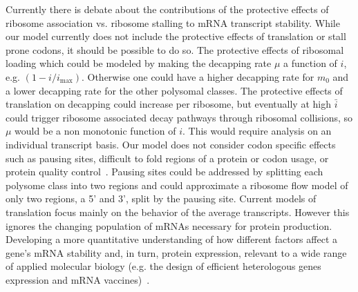 \documentclass[10pt,letterpaper]{article}
\newcommand{\imax}{\ensuremath{{i_{\max}}}\xspace}
\newcommand{\MRL}{\ensuremath{\bar{i}}\xspace}
\begin{document}
Currently there is debate about the contributions of the protective effects of ribosome association vs. ribosome stalling to mRNA transcript stability.
While our model currently does not include the protective effects of translation or stall prone codons, it should be possible to do so.
The protective effects of ribosomal loading which could be modeled by making the decapping rate $\mu $ a function of $i$, e.g. $(1-i/\imax)$. Otherwise one could have a higher decapping rate for $m_0$ and a lower decapping rate for the other polysomal classes.
The protective effects of translation on decapping could increase per ribosome, but eventually at high \MRL could trigger ribosome associated decay pathways through ribosomal collisions, so $\mu$ would be a non monotonic function of $i$. This would require analysis on an individual transcript basis.
Our model does not consider codon specific effects such as pausing sites, difficult to fold regions of a protein or codon usage, or protein quality control~\cite{RN39}.
Pausing sites could be addressed by splitting each polysome class into two regions and could approximate a ribosome flow model of only two regions, a 5' and 3', split by the pausing site. Current models of translation focus mainly on the behavior of the average transcripts. However this ignores the changing population of mRNAs necessary for protein production. 
Developing a more quantitative understanding of how different factors affect a gene's mRNA stability and, in turn, protein expression, relevant to a wide range of applied molecular biology (e.g. the design of efficient heterologous genes expression and mRNA vaccines)~\cite{RN40}.
\end{document}
